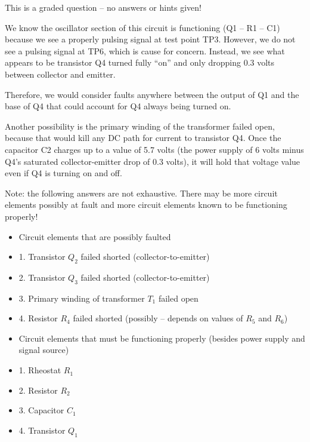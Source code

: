 \vfil 

\eject






This is a graded question -- no answers or hints given!







We know the oscillator section of this circuit is functioning (Q1 -- R1 -- C1) because we see a properly pulsing signal at test point TP3.  However, we do not see a pulsing signal at TP6, which is cause for concern.  Instead, we see what appears to be transistor Q4 turned fully ``on'' and only dropping 0.3 volts between collector and emitter.  

Therefore, we would consider faults anywhere between the output of Q1 and the base of Q4 that could account for Q4 always being turned on.

Another possibility is the primary winding of the transformer failed open, because that would kill any DC path for current to transistor Q4.  Once the capacitor C2 charges up to a value of 5.7 volts (the power supply of 6 volts minus Q4's saturated collector-emitter drop of 0.3 volts), it will hold that voltage value even if Q4 is turning on and off.

\vskip 10pt

Note: the following answers are not exhaustive.  There may be more circuit elements possibly at fault and more circuit elements known to be functioning properly!

\begin{itemize}
\item{} Circuit elements that are possibly faulted
\item{1.} Transistor $Q_2$ failed shorted (collector-to-emitter)
\item{2.} Transistor $Q_3$ failed shorted (collector-to-emitter)
\item{3.} Primary winding of transformer $T_1$ failed open
\item{4.} Resistor $R_4$ failed shorted (possibly -- depends on values of $R_5$ and $R_6$)
\end{itemize}

\begin{itemize}
\item{} Circuit elements that must be functioning properly (besides power supply and signal source)
\item{1.} Rheostat $R_1$
\item{2.} Resistor $R_2$
\item{3.} Capacitor $C_1$
\item{4.} Transistor $Q_1$
\end{itemize}




